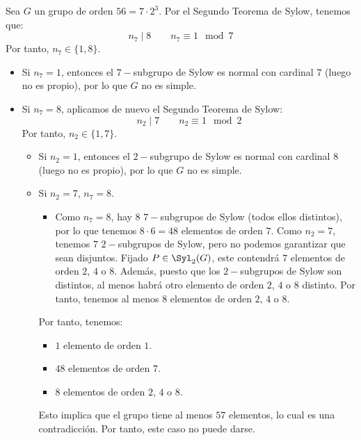 \begin{ejercicio}
\begin{enumerate}
        Sea $G$ un grupo de orden $56=7\cdot 2^3$. Por el Segundo Teorema de Sylow, tenemos que:
        \begin{equation*}
            n_7 \mid 8 \qquad n_7 \equiv 1 \mod 7
        \end{equation*}
        Por tanto, $n_7\in \{1,8\}$.
        \begin{itemize}
            \item Si $n_7=1$, entonces el $7-$subgrupo de Sylow es normal con cardinal $7$ (luego no es propio), por lo que $G$ no es simple.
            \item Si $n_7=8$, aplicamos de nuevo el Segundo Teorema de Sylow:
            \begin{equation*}
                n_2 \mid 7 \qquad n_2 \equiv 1 \mod 2
            \end{equation*}
            Por tanto, $n_2\in \{1,7\}$.
            \begin{itemize}
                \item Si $n_2=1$, entonces el $2-$subgrupo de Sylow es normal con cardinal $8$ (luego no es propio), por lo que $G$ no es simple.
                \item Si $n_2=7$, $n_7=8$.
                \begin{itemize}
                    \item Como $n_7=8$, hay $8$ $7-$subgrupos de Sylow (todos ellos distintos), por lo que tenemos $8\cdot 6=48$ elementos de orden $7$. Como $n_2=7$, tenemos $7$ $2-$subgrupos de Sylow, pero no podemos garantizar que sean disjuntos. Fijado $P\in \Syl_2(G)$, este contendrá $7$ elementos de orden $2$, $4$ o $8$. Además, puesto que  los $2-$subgrupos de Sylow son distintos, al menos habrá otro elemento de orden $2$, $4$ o $8$ distinto. Por tanto, tenemos al menos $8$ elementos de orden $2$, $4$ o $8$. 
                \end{itemize}
                
                Por tanto, tenemos:
                \begin{itemize}
                    \item $1$ elemento de orden $1$.
                    \item $48$ elementos de orden $7$.
                    \item $8$ elementos de orden $2$, $4$ o $8$.
                \end{itemize}
                Esto implica que el grupo tiene al menos $57$ elementos, lo cual es una contradicción. Por tanto, este caso no puede darse.
            \end{itemize}
        \end{itemize}


\end{enumerate}
\end{ejercicio}
